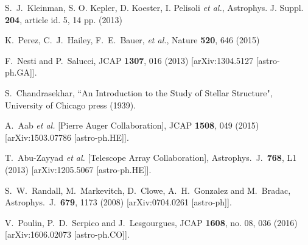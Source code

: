S.~J.~Kleinman, S. O. Kepler, D. Koester, I. Pelisoli  {\it et al.}, Astrophys. J. Suppl. {\bf 204}, article
id. 5, 14 pp. (2013)

K.~Perez, C.~J.~Hailey, F.~E.~Bauer, {\it et al.}, Nature {\bf 520}, 646 (2015)

  F.~Nesti and P.~Salucci,
  JCAP {\bf 1307}, 016 (2013)
  [arXiv:1304.5127 [astro-ph.GA]].


S.~Chandrasekhar, ``An Introduction to the Study of Stellar Structure", University of Chicago press (1939).

  A.~Aab {\it et al.} [Pierre Auger Collaboration],
  JCAP {\bf 1508}, 049 (2015)
  [arXiv:1503.07786 [astro-ph.HE]].


  T.~Abu-Zayyad {\it et al.} [Telescope Array Collaboration],
  Astrophys.\ J.\  {\bf 768}, L1 (2013)
  [arXiv:1205.5067 [astro-ph.HE]].


  S.~W.~Randall, M.~Markevitch, D.~Clowe, A.~H.~Gonzalez and M.~Bradac,
  Astrophys.\ J.\  {\bf 679}, 1173 (2008)
  [arXiv:0704.0261 [astro-ph]].


  V.~Poulin, P.~D.~Serpico and J.~Lesgourgues,
  JCAP {\bf 1608}, no. 08, 036 (2016)
  [arXiv:1606.02073 [astro-ph.CO]].


